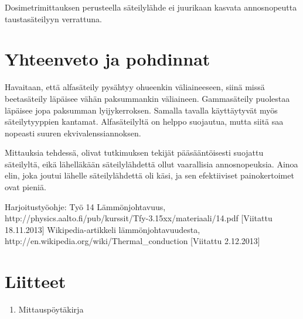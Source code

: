 \documentclass[a4paper,11pt]{article}
\begin{document}
Dosimetrimittauksen perusteella säteilylähde ei juurikaan kasvata annosnopeutta taustasäteilyyn verrattuna. 

\section{Yhteenveto ja pohdinnat}

Havaitaan, että alfasäteily pysähtyy ohueenkin väliaineeseen, siinä missä beetasäteily läpäisee vähän paksummankin väliaineen. Gammasäteily puolestaa läpäisee jopa paksumman lyijykerroksen. Samalla tavalla käyttäytyvät myös säteilytyyppien kantamat. Alfasäteilyltä on helppo suojautua, mutta siitä saa nopeasti suuren ekvivalenssiannoksen. 

Mittauksia tehdessä, olivat tutkimuksen tekijät pääsääntöisesti suojattu säteilyltä, eikä lähelläkään säteilylähdettä ollut vaarallisia annosnopeuksia. Ainoa elin, joka joutui lähelle säteilylähdettä oli käsi, ja sen efektiiviset painokertoimet ovat pieniä. 


\begin{thebibliography}{99}

 Harjoitustyöohje: Työ 14 Lämmönjohtavuus, http://physics.aalto.fi/pub/kurssit/Tfy-3.15xx/materiaali/14.pdf [Viitattu 18.11.2013]
 Wikipedia-artikkeli lämmönjohtavuudesta, http://en.wikipedia.org/wiki/Thermal\_conduction [Viitattu 2.12.2013]

\end{thebibliography}

\section*{Liitteet}
\begin{enumerate}
\item{Mittauspöytäkirja}\label{mittaus}

\end{enumerate}
\end{document}
